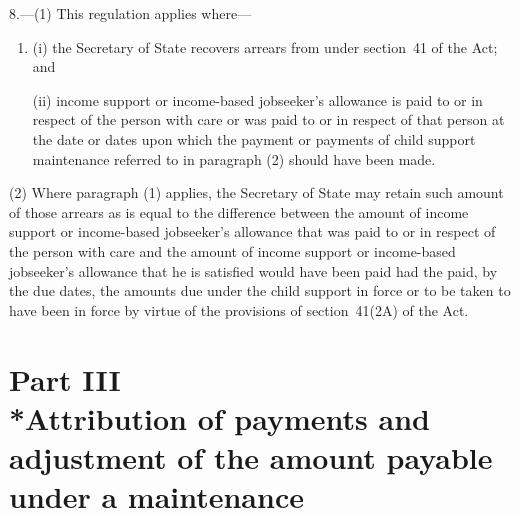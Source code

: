 \documentclass[12pt,a4paper]{article}
\begin{document}
8.—(1) This regulation applies where—
\begin{enumerate}\item[]
(i) the Secretary of State recovers arrears from 
under section~41 of the Act; and

(ii) income support
or income-based jobseeker’s allowance  %
is paid to or in respect of the person with care or was paid to or in respect of that person at the date or dates upon which the payment or payments of child support maintenance referred to in paragraph (2) should have been made.
\end{enumerate}

(2) Where paragraph (1) applies, the Secretary of State may retain such amount of those arrears as is equal to the difference between the amount of income support 
or income-based jobseeker’s allowance  %
that was paid to or in respect of the person with care and the amount of income support 
or income-based jobseeker’s allowance  %
that he is satisfied would have been paid had the 
paid, by the due dates, the amounts due under the child support 
in force or to be taken to have been in force by virtue of the provisions of section~41(2A) of the Act.


\section[Part III --- Attribution of payments and adjustment of the amount payable under a maintenance \opt{oldrules}{assessment}\opt{newrules}{calculation}]{\sloppy Part III\\*Attribution of payments and adjustment of the amount payable under a maintenance }  %
\end{document}
